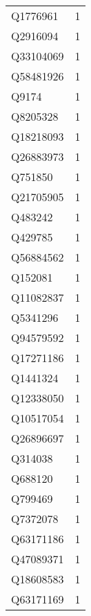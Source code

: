\begin{tabular}{lr}
    Q1776961 &                             1 \\
    Q2916094 &                             1 \\
   Q33104069 &                             1 \\
   Q58481926 &                             1 \\
       Q9174 &                             1 \\
    Q8205328 &                             1 \\
   Q18218093 &                             1 \\
   Q26883973 &                             1 \\
     Q751850 &                             1 \\
   Q21705905 &                             1 \\
     Q483242 &                             1 \\
     Q429785 &                             1 \\
   Q56884562 &                             1 \\
     Q152081 &                             1 \\
   Q11082837 &                             1 \\
    Q5341296 &                             1 \\
   Q94579592 &                             1 \\
   Q17271186 &                             1 \\
    Q1441324 &                             1 \\
   Q12338050 &                             1 \\
   Q10517054 &                             1 \\
   Q26896697 &                             1 \\
     Q314038 &                             1 \\
     Q688120 &                             1 \\
     Q799469 &                             1 \\
    Q7372078 &                             1 \\
   Q63171186 &                             1 \\
   Q47089371 &                             1 \\
   Q18608583 &                             1 \\
   Q63171169 &                             1 \\

\end{tabular}
